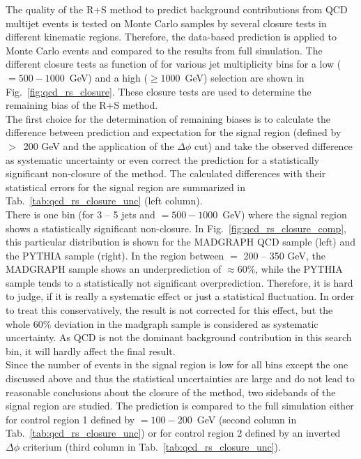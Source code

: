 The quality of the R+S method to predict background contributions from QCD multijet events is tested on Monte Carlo samples by several closure tests in different kinematic regions. Therefore, the data-based prediction is applied to Monte Carlo events and compared to the results from full simulation. The different closure tests as function of \MHT for various jet multiplicity bins for a low \HT ($= 500 - 1000$~GeV) and a high \HT ($\ge 1000$~GeV) selection are shown in Fig.~\ref{fig:qcd_rs_closure}. These closure tests are used to determine the remaining bias of the R+S method. \\
The first choice for the determination of remaining biases is to calculate the difference between prediction and expectation for the signal region (defined by \MHT $>$~200 GeV and the application of the $\Delta \phi$ cut) and take the observed difference as systematic uncertainty or even correct the prediction for a statistically significant non-closure of the method. The calculated differences with their statistical errors for the signal region are summarized in Tab.~\ref{tab:qcd_rs_closure_unc} (left column). \\
There is one bin (for 3 -- 5 jets and \HT $= 500 - 1000$~GeV) where the signal region shows a statistically significant non-closure. In Fig.~\ref{fig:qcd_rs_closure_comp}, this particular distribution is shown for the MADGRAPH QCD sample (left) and the PYTHIA sample (right). In the region between \MHT $=$ 200 -- 350 GeV, the MADGRAPH sample shows an underprediction of $\approx 60\%$, while the PYTHIA sample tends to a statistically not significant overprediction. Therefore, it is hard to judge, if it is really a systematic effect or just a statistical fluctuation. In order to treat this conservatively, the result is not corrected for this effect, but the whole $60\%$ deviation in the madgraph sample is considered as systematic uncertainty. As QCD is not the dominant background contribution in this search bin, it will hardly affect the final result.\\
Since the number of events in the signal region is low for all bins except the one discussed above and thus the statistical uncertainties are large and do not lead to reasonable conclusions about the closure of the method, two sidebands of the signal region are studied. The prediction is compared to the full simulation either for control region 1 defined by \MHT $= 100 - 200$~GeV (second column in Tab.~\ref{tab:qcd_rs_closure_unc}) or for control region 2 defined by an inverted $\Delta \phi$ criterium (third column in Tab.~\ref{tab:qcd_rs_closure_unc}). 
